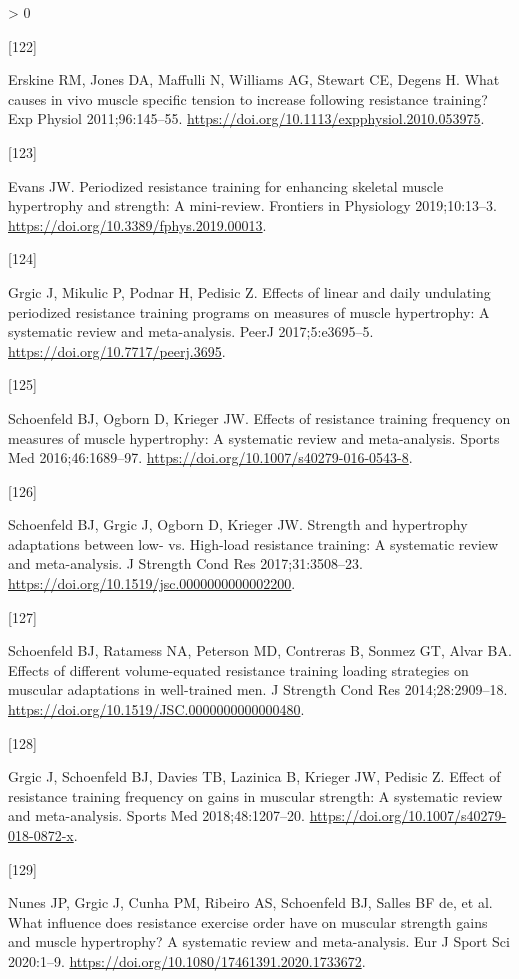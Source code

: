 \documentclass[twoside,10pt]{gihclass} %
\newlength{\cslhangindent}
\newlength{\csllabelwidth}
\newenvironment{CSLReferences}[3] %
 {%
  \setlength{\parindent}{0pt}
  \ifodd #1 \everypar{\setlength{\hangindent}{\cslhangindent}}\ignorespaces\fi
  \ifnum #2 > 0
  \setlength{\parskip}{#2\baselineskip}
  \fi
 }%
 {}
\newcommand{\CSLLeftMargin}[1]{\parbox[t]{\maxof{\widthof{#1}}{\csllabelwidth}}{#1}}
\newcommand{\CSLRightInline}[1]{\parbox[t]{\linewidth}{#1}}
\begin{document}
\begin{CSLReferences}{0}{0}
\leavevmode\hypertarget{ref-RN1504}{}%
\CSLLeftMargin{{[}122{]} }
\CSLRightInline{Erskine RM, Jones DA, Maffulli N, Williams AG, Stewart CE, Degens H. What causes in vivo muscle specific tension to increase following resistance training? Exp Physiol 2011;96:145--55. \url{https://doi.org/10.1113/expphysiol.2010.053975}.}

\leavevmode\hypertarget{ref-RN2575}{}%
\CSLLeftMargin{{[}123{]} }
\CSLRightInline{Evans JW. Periodized resistance training for enhancing skeletal muscle hypertrophy and strength: A mini-review. Frontiers in Physiology 2019;10:13--3. \url{https://doi.org/10.3389/fphys.2019.00013}.}

\leavevmode\hypertarget{ref-RN2572}{}%
\CSLLeftMargin{{[}124{]} }
\CSLRightInline{Grgic J, Mikulic P, Podnar H, Pedisic Z. Effects of linear and daily undulating periodized resistance training programs on measures of muscle hypertrophy: A systematic review and meta-analysis. PeerJ 2017;5:e3695--5. \url{https://doi.org/10.7717/peerj.3695}.}

\leavevmode\hypertarget{ref-RN2571}{}%
\CSLLeftMargin{{[}125{]} }
\CSLRightInline{Schoenfeld BJ, Ogborn D, Krieger JW. Effects of resistance training frequency on measures of muscle hypertrophy: A systematic review and meta-analysis. Sports Med 2016;46:1689--97. \url{https://doi.org/10.1007/s40279-016-0543-8}.}

\leavevmode\hypertarget{ref-RN2569}{}%
\CSLLeftMargin{{[}126{]} }
\CSLRightInline{Schoenfeld BJ, Grgic J, Ogborn D, Krieger JW. Strength and hypertrophy adaptations between low- vs. High-load resistance training: A systematic review and meta-analysis. J Strength Cond Res 2017;31:3508--23. \url{https://doi.org/10.1519/jsc.0000000000002200}.}

\leavevmode\hypertarget{ref-RN1612}{}%
\CSLLeftMargin{{[}127{]} }
\CSLRightInline{Schoenfeld BJ, Ratamess NA, Peterson MD, Contreras B, Sonmez GT, Alvar BA. Effects of different volume-equated resistance training loading strategies on muscular adaptations in well-trained men. J Strength Cond Res 2014;28:2909--18. \url{https://doi.org/10.1519/JSC.0000000000000480}.}

\leavevmode\hypertarget{ref-RN2570}{}%
\CSLLeftMargin{{[}128{]} }
\CSLRightInline{Grgic J, Schoenfeld BJ, Davies TB, Lazinica B, Krieger JW, Pedisic Z. Effect of resistance training frequency on gains in muscular strength: A systematic review and meta-analysis. Sports Med 2018;48:1207--20. \url{https://doi.org/10.1007/s40279-018-0872-x}.}

\leavevmode\hypertarget{ref-RN2591}{}%
\CSLLeftMargin{{[}129{]} }
\CSLRightInline{Nunes JP, Grgic J, Cunha PM, Ribeiro AS, Schoenfeld BJ, Salles BF de, et al. What influence does resistance exercise order have on muscular strength gains and muscle hypertrophy? A systematic review and meta-analysis. Eur J Sport Sci 2020:1--9. \url{https://doi.org/10.1080/17461391.2020.1733672}.}


\end{CSLReferences}
\end{document}
